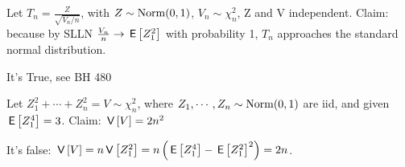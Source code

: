 \documentclass[tf-tutorial-all.tex]{subfiles}
\begin{document}
\begin{truefalse}
Let $T_n = \frac{Z}{\sqrt{V_n/n}}$, with $Z\sim \mathrm{Norm}(0,1)$, $V_n\sim \chi_n^2$, Z and V independent.
Claim: because by SLLN $\frac{V_n}{n}\rightarrow \,\mathsf{E}\left[Z_1^2\right]$ with probability 1, $T_n$ approaches the standard normal distribution.
\begin{solution}
It's True, see BH 480
\end{solution}
\end{truefalse}

\begin{truefalse}
Let $Z_1^2 + \cdots + Z_n^2 = V \sim \chi^2_n$, where $Z_1, \cdots ,Z_n \sim \mathrm{Norm}(0,1)$ are iid,
and given $\,\mathsf{E}\left[Z_1^4\right] = 3$.
Claim: $\,\mathsf{V}\left[V\right] = 2n^2$
\begin{solution}
It's false: $\,\mathsf{V}\left[V\right] = n\,\mathsf{V}\left[Z_1^2\right] = n\left(\,\mathsf{E}\left[Z_1^4\right] - \,\mathsf{E}\left[Z_1^2\right]^2\right) = 2n$.
\end{solution}
\end{truefalse}
\end{document}
